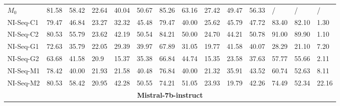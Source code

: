 \begin{table*}[]
\begin{center}
\begin{tiny}
\begin{tabular}{l|llllr|llllr|lll}
$M_0$ & 81.58 & 58.42 & 22.64 & 40.04 & 50.67 & 85.26 & 63.16 & 27.42 & 49.47 & 56.33 & / & / & / \\
NI-Seq-C1 & 79.47 & 46.84 & 23.27 & 32.32 & 45.48 & 79.47 & 40.00 & 25.62 & 45.79 & 47.72 & 83.40 & 82.10 & 1.30 \\
NI-Seq-C2 & 80.53 & 55.79 & 23.62 & 42.19 & 50.54 & 84.21 & 50.00 & 24.70 & 44.21 & 50.78 & 91.00 & 89.90 & 1.10 \\
NI-Seq-G1 & 72.63 & 35.79 & 22.05 & 29.39 & 39.97 & 67.89 & 31.05 & 19.77 & 41.58 & 40.07 & 28.29 & 21.10 & 7.20 \\
NI-Seq-G2 & 63.68 & 41.58 & 20.9 & 15.37 & 35.38 & 66.84 & 44.74 & 15.35 & 23.58 & 37.63 & 57.77 & 55.66 & 2.11 \\
NI-Seq-M1 & 78.42 & 40.00 & 21.93 & 21.58 & 40.48 & 76.84 & 40.00 & 21.32 & 35.91 & 43.52 & 60.74 & 52.63 & 8.11 \\
NI-Seq-M2 & 80.53 & 58.42 & 20.95 & 42.28 & 50.55 & 74.21 & 51.05 & 23.93 & 19.79 & 42.26 & 74.49 & 52.34 & 22.16 \\ \midrule
 \multicolumn{14}{c}{\textbf{Mistral-7b-instruct}} \\ \midrule
				

\end{tabular}
\end{tiny}
\end{center}
\end{table*}
